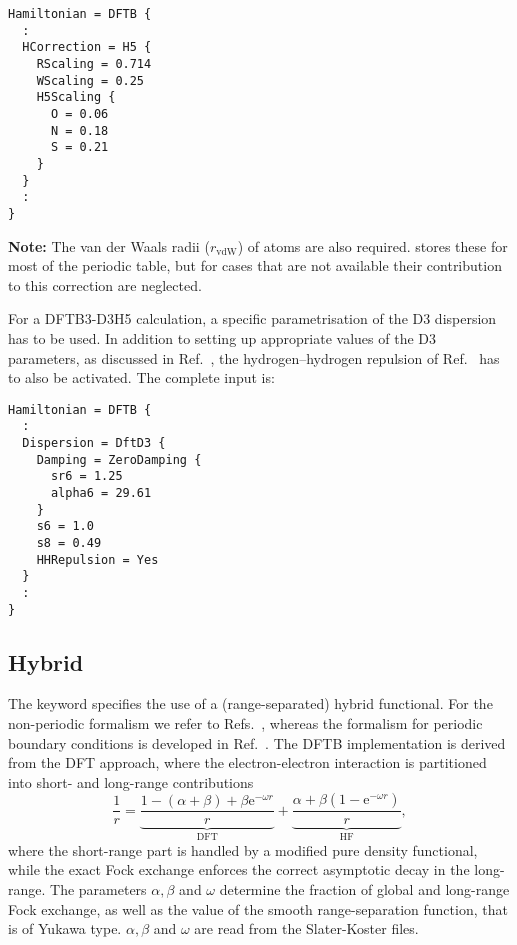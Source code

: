 \begin{verbatim}
Hamiltonian = DFTB {
  :
  HCorrection = H5 {
    RScaling = 0.714
    WScaling = 0.25
    H5Scaling {
      O = 0.06
      N = 0.18
      S = 0.21
    }
  }
  :
}
\end{verbatim}

\textbf{Note:} \label{page:dftbp.H5} The van der Waals radii ($r_\text{vdW}$) of
atoms are also required. \dftbp{} stores these for most of the periodic table,
but for cases that are not available their contribution to this correction are
neglected.

For a DFTB3-D3H5 calculation, a specific parametrisation of the D3 dispersion
has to be used. In addition to setting up appropriate values of the D3
parameters, as discussed in Ref.~\cite{rezac-jctc-13-2017}, the
hydrogen--hydrogen repulsion of Ref.~\cite{rezac-jctc-8-2012} has to also be
activated. The complete input is:
\begin{verbatim}
Hamiltonian = DFTB {
  :
  Dispersion = DftD3 {
    Damping = ZeroDamping {
      sr6 = 1.25
      alpha6 = 29.61
    }
    s6 = 1.0
    s8 = 0.49
    HHRepulsion = Yes
  }
  :
}
\end{verbatim}

\subsection{Hybrid}
\label{sec:dftbp.Hybrid}

The  keyword specifies the use of a (range-separated) hybrid functional.
For the non-periodic formalism we refer to
Refs.~\cite{niehaus-PSSB-249-237,lutsker-JCP-143-184107}, whereas the formalism for
periodic boundary conditions is developed in Ref.~\cite{vdH-PRM-7-063802}.
The DFTB implementation is derived from the DFT approach, where the electron-electron
interaction is partitioned into short- and long-range contributions
\begin{equation*}
\frac{1}{r} = \underbrace{\frac{1 - (\alpha + \beta)
+ \beta \mathrm{e}^{-\omega r}}{r}}_{\text{DFT}} + \underbrace{\frac{\alpha
+ \beta (1 - \mathrm{e}^{-\omega r})}{r}}_{\text{HF}},
\end{equation*}
where the short-range part is handled by a modified pure density functional, while
the exact Fock exchange enforces the correct asymptotic decay in the long-range.
The parameters $\alpha, \beta$ and $\omega$ determine the fraction of global and
long-range Fock exchange, as well as the value of the smooth range-separation function,
that is of Yukawa type. $\alpha, \beta$ and $\omega$ are read from the Slater-Koster files.

